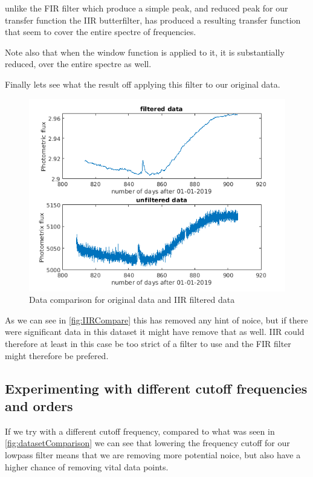 unlike the FIR filter which produce a simple peak, and reduced peak for our transfer function the IIR butterfilter, has
produced a resulting transfer function that seem to cover the entire spectre of frequencies.

Note also that when the window function is applied to it, it is
substantially reduced, over the entire spectre as well.

Finally lets see what the result off applying this filter to our original data.

\begin{figure}[h]
  \centering
  \includegraphics[scale=0.60]{matlabStuff/IIRFilterCompare.png}
  \caption{Data comparison for original data and IIR filtered data}%
  \label{fig:IIRCompare}
\end{figure}

As we can see in \autoref{fig:IIRCompare} this has removed any
hint of noice, but if there were significant data in this
dataset it might have remove that as well.
IIR could therefore at least in this case be too strict of a 
filter to use and the FIR filter might therefore be prefered.

\newpage

\subsection{Experimenting with different cutoff frequencies and orders}
If we try with a different cutoff frequency, compared to what
was seen in \autoref{fig:datasetComparison} we can see that
lowering the frequency cutoff for our lowpass filter
means that we are removing more potential noice, but
also have a higher chance of removing vital data points.

